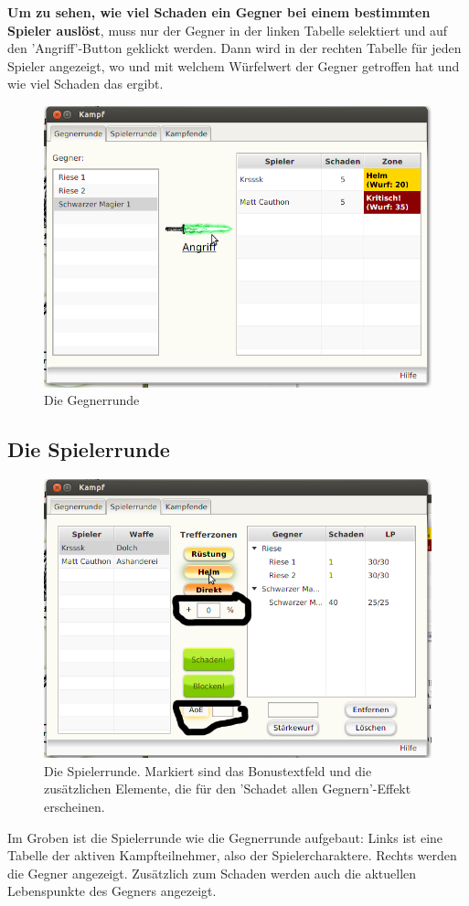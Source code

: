 \documentclass[11pt, a4paper, german]{article}
\begin{document}
\textbf{Um zu sehen, wie viel Schaden ein Gegner bei einem bestimmten Spieler auslöst}, muss nur der Gegner in der linken Tabelle selektiert und auf den 'Angriff'-Button geklickt werden. Dann wird in der rechten Tabelle für jeden Spieler angezeigt, wo und mit welchem Würfelwert der Gegner getroffen hat und wie viel Schaden das ergibt.
\begin{figure}
\centering
\includegraphics[width=.7\linewidth]{Bilder/Gegnerrunde.png}
\caption{Die Gegnerrunde}
\end{figure}
\subsection{Die Spielerrunde}\label{Abschnitt:Spielerrunde}
\begin{figure}
\centering
\includegraphics[width=\linewidth]{Bilder/Spielerrunde.png}
\caption{Die Spielerrunde. Markiert sind das Bonustextfeld und die zusätzlichen Elemente, die für den 'Schadet allen Gegnern'-Effekt  erscheinen.}
\label{Bild:Spielerrunde}
\end{figure}
Im Groben ist die Spielerrunde wie die Gegnerrunde aufgebaut: Links ist eine Tabelle der aktiven Kampfteilnehmer, also der Spielercharaktere. Rechts werden die Gegner angezeigt. Zusätzlich zum Schaden werden auch die aktuellen Lebenspunkte des Gegners angezeigt.
\end{document}
